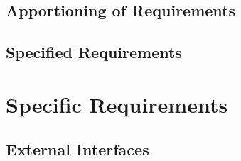 \documentclass{scrreprt}
\begin{document}
\section{Apportioning of Requirements}

\section{Specified Requirements}

\chapter{Specific Requirements}

\section{External Interfaces}

\end{document}
